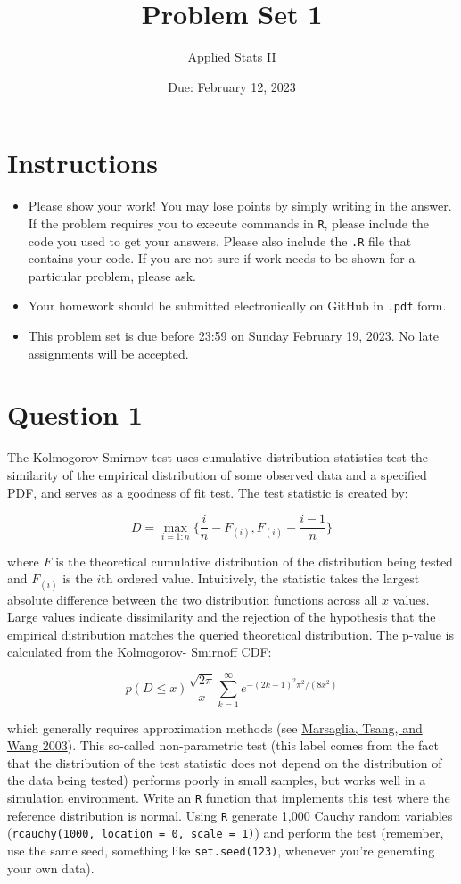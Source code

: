 \documentclass[12pt,letterpaper]{article}
\title{Problem Set 1}
\date{Due: February 12, 2023}
\author{Applied Stats II}
\begin{document}
	\maketitle
	\section*{Instructions}
	\begin{itemize}
	\item Please show your work! You may lose points by simply writing in the answer. If the problem requires you to execute commands in \texttt{R}, please include the code you used to get your answers. Please also include the \texttt{.R} file that contains your code. If you are not sure if work needs to be shown for a particular problem, please ask.
\item Your homework should be submitted electronically on GitHub in \texttt{.pdf} form.
\item This problem set is due before 23:59 on Sunday February 19, 2023. No late assignments will be accepted.
	\end{itemize}

	\vspace{.25cm}
\section*{Question 1}
\vspace{.25cm}
\noindent The Kolmogorov-Smirnov test uses cumulative distribution statistics test the similarity of the empirical distribution of some observed data and a specified PDF, and serves as a goodness of fit test. The test statistic is created by:

$$D = \max_{i=1:n} \Big\{ \frac{i}{n}  - F_{(i)}, F_{(i)} - \frac{i-1}{n} \Big\}$$

\noindent where $F$ is the theoretical cumulative distribution of the distribution being tested and $F_{(i)}$ is the $i$th ordered value. Intuitively, the statistic takes the largest absolute difference between the two distribution functions across all $x$ values. Large values indicate dissimilarity and the rejection of the hypothesis that the empirical distribution matches the queried theoretical distribution. The p-value is calculated from the Kolmogorov-
Smirnoff CDF:

$$p(D \leq x) \frac{\sqrt {2\pi}}{x} \sum _{k=1}^{\infty }e^{-(2k-1)^{2}\pi ^{2}/(8x^{2})}$$


\noindent which generally requires approximation methods (see \href{https://core.ac.uk/download/pdf/25787785.pdf}{Marsaglia, Tsang, and Wang 2003}). This so-called non-parametric test (this label comes from the fact that the distribution of the test statistic does not depend on the distribution of the data being tested) performs poorly in small samples, but works well in a simulation environment. Write an \texttt{R} function that implements this test where the reference distribution is normal. Using \texttt{R} generate 1,000 Cauchy random variables (\texttt{rcauchy(1000, location = 0, scale = 1)}) and perform the test (remember, use the same seed, something like \texttt{set.seed(123)}, whenever you're generating your own data).\\
\end{document}
